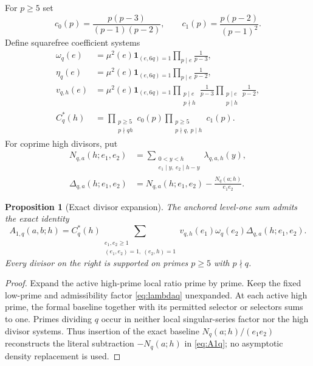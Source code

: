 \documentclass[11pt]{article}
\newtheorem{proposition}[theorem]{Proposition}
\theoremstyle{definition}
\theoremstyle{remark}
\newcommand{\1}{\mathbf 1}
\newcommand{\e}{\mathrm e}
\begin{document}
For $p\ge5$ set
\begin{equation}\label{eq:c0c1}
c_0(p)=\frac{p(p-3)}{(p-1)(p-2)},
\qquad
c_1(p)=\frac{p(p-2)}{(p-1)^2}.
\end{equation}
Define squarefree coefficient systems
\begin{align}
\omega_q(e)
&=\mu^2(e)\1_{(e,6q)=1}\prod_{p\mid e}\frac1{p-3},\label{eq:omegaq}\\
\eta_q(e)
&=\mu^2(e)\1_{(e,6q)=1}\prod_{p\mid e}\frac1{p-2},\label{eq:etaq}\\
v_{q,h}(e)
&=\mu^2(e)\1_{(e,6q)=1}
\prod_{\substack{p\mid e\\p\nmid h}}\frac1{p-3}
\prod_{\substack{p\mid e\\p\mid h}}\frac1{p-2},\label{eq:vqh}\\
C_q^*(h)
&=\prod_{\substack{p\ge5\\p\nmid qh}}c_0(p)
\prod_{\substack{p\ge5\\p\nmid q,\ p\mid h}}c_1(p).\label{eq:Cqstar}
\end{align}
For coprime high divisors, put
\begin{align}
N_{q,a}(h;e_1,e_2)
&=\sum_{\substack{0<y<h\\e_1\mid y,\ e_2\mid h-y}}
\lambda_{q,a,h}(y),\label{eq:Nqea}\\
\Delta_{q,a}(h;e_1,e_2)
&=N_{q,a}(h;e_1,e_2)-\frac{N_q(a;h)}{e_1e_2}.\label{eq:Deltaqea}
\end{align}

\begin{proposition}[Exact divisor expansion]\label{prop:divisor-expansion}
The anchored level-one sum admits the exact identity
\begin{equation}\label{eq:Tq-expansion}
\boxed{
A_{1,q}(a,b;h)
=C_q^*(h)
\sum_{\substack{e_1,e_2\ge1\\(e_1,e_2)=1,\ (e_2,h)=1}}
v_{q,h}(e_1)\omega_q(e_2)
\Delta_{q,a}(h;e_1,e_2).
}
\end{equation}
Every divisor on the right is supported on primes $p\ge5$ with $p\nmid q$.
\end{proposition}

\begin{proof}
Expand the active high-prime local ratio prime by prime.  Keep the fixed low-prime and admissibility factor \eqref{eq:lambdaq} unexpanded.  At each active high prime, the formal baseline together with its permitted selector or selectors sums to one.  Primes dividing $q$ occur in neither local singular-series factor nor the high divisor systems.  Thus insertion of the exact baseline $N_q(a;h)/(e_1e_2)$ reconstructs the literal subtraction $-N_q(a;h)$ in \eqref{eq:A1q}; no asymptotic density replacement is used.
\end{proof}
\end{document}

